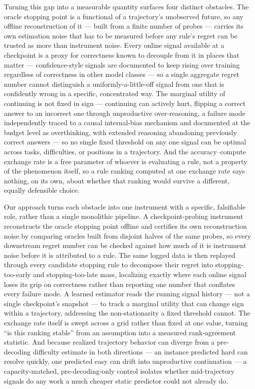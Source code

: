 \documentclass[11pt]{article}
\begin{document}
Turning this gap into a measurable quantity surfaces four distinct obstacles. The oracle stopping point is a functional of a trajectory's unobserved future, so any offline reconstruction of it --- built from a finite number of probes --- carries its own estimation noise that has to be measured before any rule's regret can be trusted as more than instrument noise. Every online signal available at a checkpoint is a proxy for correctness known to decouple from it in places that matter --- confidence-style signals are documented to keep rising over training regardless of correctness in other model classes \citep{Chen2023Close} --- so a single aggregate regret number cannot distinguish a uniformly-a-little-off signal from one that is confidently wrong in a specific, concentrated way. The marginal utility of continuing is not fixed in sign --- continuing can actively hurt, flipping a correct answer to an incorrect one through unproductive over-reasoning, a failure mode independently traced to a causal internal-bias mechanism \citep{FirstImpression2607} and documented at the budget level as overthinking, with extended reasoning abandoning previously correct answers \citep{MoreThinkingHurts2604} --- so no single fixed threshold on any one signal can be optimal across tasks, difficulties, or positions in a trajectory. And the accuracy--compute exchange rate is a free parameter of whoever is evaluating a rule, not a property of the phenomenon itself, so a rule ranking computed at one exchange rate says nothing, on its own, about whether that ranking would survive a different, equally defensible choice.

Our approach turns each obstacle into one instrument with a specific, falsifiable role, rather than a single monolithic pipeline. A checkpoint-probing instrument reconstructs the oracle stopping point offline and certifies its own reconstruction noise by comparing oracles built from disjoint halves of the same probes, so every downstream regret number can be checked against how much of it is instrument noise before it is attributed to a rule. The same logged data is then replayed through every candidate stopping rule to decompose their regret into stopping-too-early and stopping-too-late mass, localizing exactly where each online signal loses its grip on correctness rather than reporting one number that conflates every failure mode. A learned estimator reads the running signal history --- not a single checkpoint's snapshot --- to track a marginal utility that can change sign within a trajectory, addressing the non-stationarity a fixed threshold cannot. The exchange rate itself is swept across a grid rather than fixed at one value, turning ``is this ranking stable'' from an assumption into a measured rank-agreement statistic. And because realized trajectory behavior can diverge from a pre-decoding difficulty estimate in both directions --- an instance predicted hard can resolve quickly, one predicted easy can drift into unproductive continuation --- a capacity-matched, pre-decoding-only control isolates whether mid-trajectory signals do any work a much cheaper static predictor could not already do.
\end{document}
